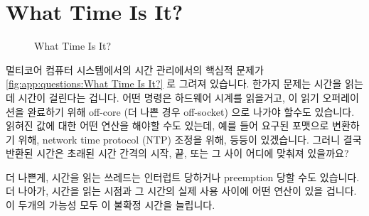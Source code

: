
\section{What Time Is It?}
\label{sec:app:questions:What Time Is It?}

\begin{figure}[tb]
\centering
{}
\caption{What Time Is It?}
\end{figure}

멀티코어 컴퓨터 시스템에서의 시간 관리에서의 핵심적 문제가
\cref{fig:app:questions:What Time Is It?} 로 그려져 있습니다.
한가지 문제는 시간을 읽는데 시간이 걸린다는 겁니다.
어떤 명령은 하드웨어 시계를 읽을거고, 이 읽기 오퍼레이션을 완료하기 위해
off-core (더 나쁜 경우 off-socket) 으로 나가야 할수도 있습니다.
읽혀진 값에 대한 어떤 연산을 해야할 수도 있는데, 예를 들어 요구된 포맷으로
변환하기 위해, network time protocol (NTP) 조정을 위해, 등등이 있겠습니다.
그러니 결국 반환된 시간은 초래된 시간 간격의 시작, 끝, 또는 그 사이 어디에
맞춰져 있을까요?

더 나쁜게, 시간을 읽는 쓰레드는 인터럽트 당하거나 preemption 당할 수도
있습니다.
더 나아가, 시간을 읽는 시점과 그 시간의 실제 사용 사이에 어떤 연산이 있을
겁니다.
이 두개의 가능성 모두 이 불확정 시간을 늘립니다.

